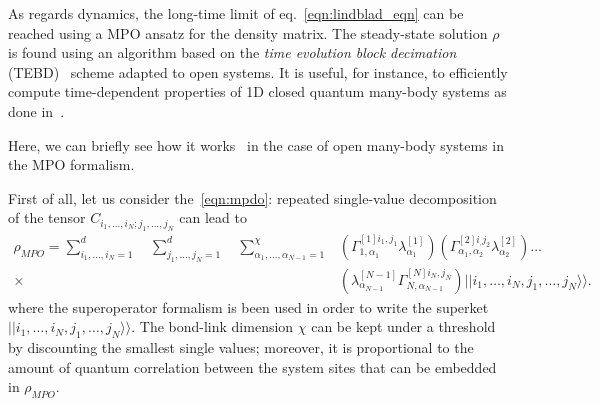 As regards dynamics, the long-time limit of eq.~\ref{eqn:lindblad_eqn} can be reached using a MPO ansatz for the density matrix. The steady-state solution $\rho$ is found using an algorithm based on the \emph{time evolution block decimation} (TEBD)~\cite{PhysRevLett.91.147902} scheme adapted to open systems. It is useful, for instance, to efficiently compute time-dependent properties of 1D closed quantum many-body systems as done in~\cite{PhysRevLett.93.040502}. 

Here, we can briefly see how it works~\cite{jin_biella_ross} in the case of open many-body systems in the MPO formalism. 

First of all, let us consider the~\ref{eqn:mpdo}: repeated single-value decomposition of the tensor $C_{i_1,\dots, i_N; j_1,\dots, j_N}$ can lead to
\begin{equation*}
\label{mpo_ansatz}
\begin{split}
    \rho_{MPO} = \sum_{i_1, \dots ,i_N = 1}^{d}\quad \sum_{j_1, \dots ,j_N = 1}^{d}\quad \sum_{\alpha_1,\dots, \alpha_{N-1} = 1}^\chi &(\Gamma_{1, \alpha_1}^{[1]i_1, j_1}\lambda_{\alpha_1}^{[1]})(\Gamma_{\alpha_1, \alpha_2}^{[2]i_, j_2}\lambda_{\alpha_2}^{[2]}) \dots \\  \times &(\lambda_{\alpha_{N-1}}^{[N-1]}\Gamma_{N, \alpha_{N-1}}^{[N]i_N, j_N}) ||i_1, \dots ,i_N, j_1, \dots ,j_N\rangle\rangle.
    \end{split}
\end{equation*}
where the superoperator formalism is been used in order to write the superket \\$||i_1, \dots ,i_N, j_1, \dots ,j_N\rangle\rangle$. The bond-link dimension $\chi$ can be kept under a threshold by discounting the smallest single values; moreover, it is proportional to the amount of quantum correlation between the system sites that can be embedded in $\rho_{MPO}$.

